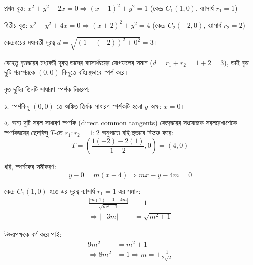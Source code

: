 \documentclass[12pt, a4paper]{article}
\begin{document}
\begin{tcolorbox}[solutionbox={সমাধান (Solution)}]
    \noindent
    প্রথম বৃত্ত: $x^2 + y^2 - 2x = 0 \Rightarrow (x-1)^2 + y^2 = 1$ 
    (কেন্দ্র $C_1(1, 0)$, ব্যাসার্ধ $r_1 = 1$)
    
    \vspace{0.5em}
    দ্বিতীয় বৃত্ত: $x^2 + y^2 + 4x = 0 \Rightarrow (x+2)^2 + y^2 = 4$ 
    (কেন্দ্র $C_2(-2, 0)$, ব্যাসার্ধ $r_2 = 2$)
    
    \vspace{0.5em}
    কেন্দ্রদ্বয়ের মধ্যবর্তী দূরত্ব $d = \sqrt{(1 - (-2))^2 + 0^2} = 3$।
    
    \vspace{0.5em}
    যেহেতু বৃত্তদ্বয়ের মধ্যবর্তী দূরত্ব তাদের ব্যাসার্ধদ্বয়ের যোগফলের সমান ($d = r_1 + r_2 = 1 + 2 = 3$), তাই বৃত্ত দুটি পরস্পরকে $(0, 0)$ বিন্দুতে বহিঃস্থভাবে স্পর্শ করে।
    
    \vspace{0.5em}
    বৃত্ত দুটির তিনটি সাধারণ স্পর্শক নিম্নরূপ:
    
    \vspace{0.5em}
    ১. স্পর্শবিন্দু $(0, 0)$-তে অঙ্কিত তির্যক সাধারণ স্পর্শকটি হলো $y$-অক্ষ: $x = 0$।
    
    \vspace{0.5em}
    ২. অন্য দুটি সরল সাধারণ স্পর্শক (direct common tangents) কেন্দ্রদ্বয়ের সংযোজক সরলরেখাংশকে স্পর্শকদ্বয়ের ছেদবিন্দু $T$-তে $r_1 : r_2 = 1 : 2$ অনুপাতে বহিঃস্থভাবে বিভক্ত করে:
    \[ T = \left(\frac{1(-2) - 2(1)}{1-2}, 0\right) = (4, 0) \]
    
    \vspace{0.5em}
    ধরি, স্পর্শকের সমীকরণ:
    \[ y - 0 = m(x - 4) \Rightarrow mx - y - 4m = 0 \]
    
    \vspace{0.5em}
    কেন্দ্র $C_1(1, 0)$ হতে এর দূরত্ব ব্যাসার্ধ $r_1 = 1$ এর সমান:
    \begin{align*}
        \frac{|m(1) - 0 - 4m|}{\sqrt{m^2 + 1}} &= 1 \\
        \Rightarrow |-3m| &= \sqrt{m^2 + 1}
    \end{align*}
    
    \vspace{0.5em}
    উভয়পক্ষকে বর্গ করে পাই:
    \begin{align*}
        9m^2 &= m^2 + 1 \\
        \Rightarrow 8m^2 &= 1 \Rightarrow m = \pm\frac{1}{2\sqrt{2}}
    \end{align*}
    

\end{tcolorbox}
\end{document}
